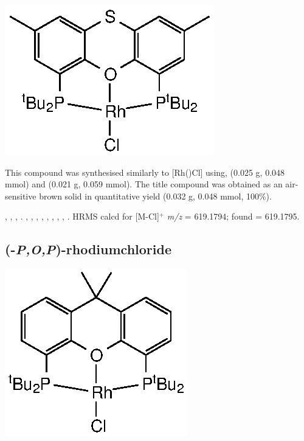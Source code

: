 \begin{structure}[h]
\begin{center}
\includegraphics{../Structures/RhCl(StBu).eps}
\end{center}
\end{structure}

This compound was synthesised similarly to [Rh(\tBusixantphos)Cl] using, \tButhixantphos{} (0.025 g, 0.048 mmol) and  (0.021 g, 0.059 mmol).  The title compound was obtained as an air-sensitive brown solid in quantitative yield (0.032 g, 0.048 mmol, 100\%).  

,
,
,
.
,
,
,
,
,
,
,
,
.
HRMS calcd for  [M-Cl]$^+$ \emph{m/z} = 619.1794; found = 619.1795.



\subsection*{(\tBuXantphosk-\emph{P,O,P})-rhodiumchloride}

\begin{structure}[h]
\begin{center}
\includegraphics{../Structures/RhCl(CtBu).eps}
\end{center}
\end{structure}

